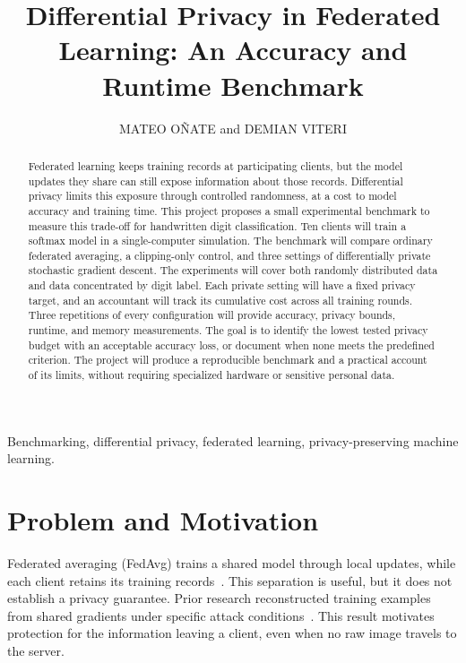 \documentclass[nolineno]{ieeeaccess}
\begin{document}
\doi{}
\title{Differential Privacy in Federated Learning: An Accuracy and Runtime Benchmark}
\author{\uppercase{Mateo O\~nate} and \uppercase{Demian Viteri}}
\address{Yachay Tech University, School of Mathematical and Computational Sciences, Ecuador}
\corresp{}

\begin{abstract}
Federated learning keeps training records at participating clients, but the model updates they share can still expose information about those records. Differential privacy limits this exposure through controlled randomness, at a cost to model accuracy and training time. This project proposes a small experimental benchmark to measure this trade-off for handwritten digit classification. Ten clients will train a softmax model in a single-computer simulation. The benchmark will compare ordinary federated averaging, a clipping-only control, and three settings of differentially private stochastic gradient descent. The experiments will cover both randomly distributed data and data concentrated by digit label. Each private setting will have a fixed privacy target, and an accountant will track its cumulative cost across all training rounds. Three repetitions of every configuration will provide accuracy, privacy bounds, runtime, and memory measurements. The goal is to identify the lowest tested privacy budget with an acceptable accuracy loss, or document when none meets the predefined criterion. The project will produce a reproducible benchmark and a practical account of its limits, without requiring specialized hardware or sensitive personal data.
\end{abstract}

\begin{keywords}
Benchmarking, differential privacy, federated learning, privacy-preserving machine learning.
\end{keywords}
\titlepgskip=-15pt
\maketitle

\section{Problem and Motivation}
Federated averaging (FedAvg) trains a shared model through local updates, while each client retains its training records~\cite{mcmahan}. This separation is useful, but it does not establish a privacy guarantee. Prior research reconstructed training examples from shared gradients under specific attack conditions~\cite{zhu}. This result motivates protection for the information leaving a client, even when no raw image travels to the server.
\end{document}
